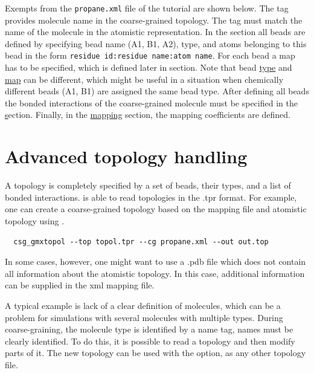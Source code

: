 Exempts from the \texttt{propane.xml} file of the tutorial are shown below. The  tag provides molecule name in the coarse-grained topology. The  tag must match the name of the molecule in the atomistic representation. In the  section all beads are defined by specifying bead name (A1, B1, A2), type, and atoms belonging to this bead in the form \texttt{residue id:residue name:atom name}. For each bead a map has to be specified, which is defined later in  section. Note that bead \hyperlink{\mapref{topology.cg_beads.cg_bead.type}}{type} and \hyperlink{\mapref{maps.map}}{map} can be different, which might be useful in a situation when chemically different beads (A1, B1) are assigned the same bead type. After defining all beads the bonded interactions of the coarse-grained molecule must be specified in the \hyperlink{\mapref{topology.cg_bonded}{cg_bonded}} section. Finally, in the \hyperlink{\mapref{topology.cg_beads.cg_bead.mapping}}{mapping} section, the mapping coefficients are defined.

\framebox{

}

\section{Advanced topology handling}
\label{sec:adv_topology}


A topology is completely specified by a set of beads, their types, and a list of bonded interactions. \votca is able to read topologies in the \gromacs .tpr format. For example, one can create a coarse-grained topology based on the mapping file and atomistic \gromacs topology using .
\begin{verbatim}
  csg_gmxtopol --top topol.tpr --cg propane.xml --out out.top
\end{verbatim}


In some cases, however, one might want to use a .pdb file which does not contain all information about the atomistic topology. In this case, additional information can be supplied in the xml mapping file.

A typical example is lack of a clear definition of molecules, which can be a problem for simulations with several molecules with multiple types. During coarse-graining, the molecule type is identified by a name tag, names must be clearly identified. To do this, it is possible to read a topology and then modify parts of it. The new \xml topology can be used with the  option, as any other topology file.

